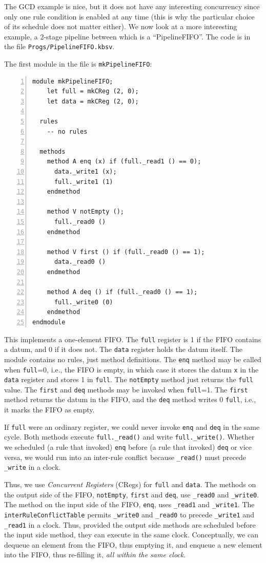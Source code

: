 \documentclass[11pt]{article}
\newcommand{\term}[1]{\texttt{#1}}
\begin{document}
The GCD example is nice, but it does not have any interesting
concurrency since only one rule condition is enabled at any time (this
is why the particular choice of its schedule does not matter either).
We now look at a more interesting example, a 2-stage pipeline between
which is a ``PipelineFIFO''.  The code is in the file
\term{Progs/PipelineFIFO.kbsv}.

The first module in the file is \term{mkPipelineFIFO}:

\begin{Verbatim}[frame=single, numbers=left, commandchars=\\\{\}]
module mkPipelineFIFO;
    let full = mkCReg (2, 0);
    let data = mkCReg (2, 0);

  rules
    -- no rules

  methods
    method A enq (x) if (full._read1 () == 0);
      data._write1 (x);
      full._write1 (1)
    endmethod

    method V notEmpty ();
      full._read0 ()
    endmethod

    method V first () if (full._read0 () == 1);
      data._read0 ()
    endmethod

    method A deq () if (full._read0 () == 1);
      full._write0 (0)
    endmethod
endmodule
\end{Verbatim}

This implements a one-element FIFO.  The \term{full} register is 1 if
the FIFO contains a datum, and 0 if it does not.  The \term{data}
register holds the datum itself.  The module contains no rules, just
method definitions.  The \term{enq} method may be called when
\term{full}=0, i.e., the FIFO is empty, in which case it stores the
datum \term{x} in the \term{data} register and stores 1 in
\term{full}.  The \term{notEmpty} method just returns the \term{full}
value. The \term{first} and \term{deq} methods may be invoked when
\term{full}=1.  The \term{first} method returns the datum in the FIFO,
and the \term{deq} method writes 0 \term{full}, i.e., it marks the
FIFO as empty.

If \term{full} were an ordinary register, we could never invoke
\term{enq} and \term{deq} in the same cycle. Both methods execute
\verb|full._read()| and write \verb|full._write()|.  Whether we
scheduled (a rule that invoked) \term{enq} before (a rule that
invoked) \term{deq} or vice versa, we would run into an inter-rule
conflict because \verb|_read()| must precede \verb|_write| in a clock.

Thus, we use \emph{Concurrent Registers} (CRegs) for \term{full} and
\term{data}.  The methods on the output side of the FIFO,
\term{notEmpty}, \term{first} and \term{deq}, use \verb|_read0| and
\verb|_write0|.  The method on the input side of the FIFO, \term{enq},
uses \verb|_read1| and \verb|_write1|.  The
\term{interRuleConflictTable} permits \verb|_write0| and \verb|_read0|
to precede \verb|_write1| and \verb|_read1| in a clock.  Thus,
provided the output side methods are scheduled before the input side
method, they can execute in the same clock.  Conceptually, we can
dequeue an element from the FIFO, thus emptying it, and enqueue a new
element into the FIFO, thus re-filling it, \emph{all within the same
clock}.
\end{document}
